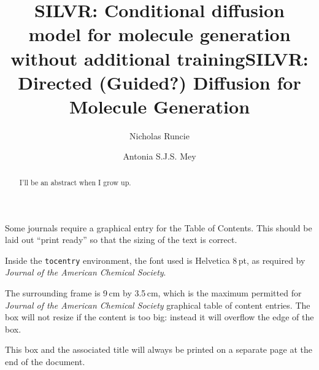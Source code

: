 \documentclass[journal=jacsat,manuscript=article]{achemso}
\author{Nicholas Runcie}
\author{Antonia S.J.S. Mey}
\title[SILVR: Molecular Generation for binding modes]
  {SILVR: Conditional diffusion model for molecule generation without additional training}
\title[SILVR: Molecular Generation for binding modes]
  {SILVR: Directed (Guided?) Diffusion for Molecule Generation}
\begin{document}
\begin{tocentry}

Some journals require a graphical entry for the Table of Contents.
This should be laid out ``print ready'' so that the sizing of the
text is correct.

Inside the \texttt{tocentry} environment, the font used is Helvetica
8\,pt, as required by \emph{Journal of the American Chemical
Society}.

The surrounding frame is 9\,cm by 3.5\,cm, which is the maximum
permitted for  \emph{Journal of the American Chemical Society}
graphical table of content entries. The box will not resize if the
content is too big: instead it will overflow the edge of the box.

This box and the associated title will always be printed on a
separate page at the end of the document.

\end{tocentry}

\begin{abstract}
I'll be an abstract when I grow up. 
\end{abstract}

\end{document}
